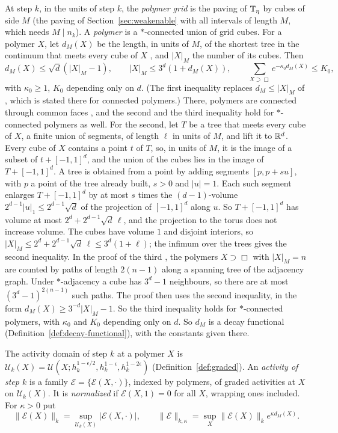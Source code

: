 At step $k$, in the units of step $k$, the \emph{polymer grid} is the paving of $\mathbb T_\eta$ by cubes of side $M$ (the paving of Section~\ref{sec:weakenable} with all intervals of length $M$, which needs $M\mid n_k$). A \emph{polymer} is a $*$-connected union of grid cubes. For a polymer $X$, let $d_M(X)$ be the length, in units of $M$, of the shortest tree in the continuum that meets every cube of $X$ \cite[(119)]{DimockI}, and $|X|_M$ the number of its cubes. Then \cite[(122), (123)]{DimockI}
\begin{equation}\label{eq:dM-facts}
d_M(X)\le\sqrt d(|X|_M-1),\qquad|X|_M\le3^d(1+d_M(X)),\qquad\sum_{X\supset\Box}e^{-\kappa_0d_M(X)}\le K_0 ,
\end{equation}
with $\kappa_0\ge1$, $K_0$ depending only on $d$. (The first inequality replaces $d_M\le|X|_M$ of \cite{DimockI}, which is stated there for connected polymers.) There, polymers are connected through common faces \cite[Sect.~3.1]{DimockI}, and the second and the third inequality hold for $*$-connected polymers as well. For the second, let $T$ be a tree that meets every cube of $X$, a finite union of segments, of length $\ell$ in units of $M$, and lift it to $\mathbb R^d$. Every cube of $X$ contains a point $t$ of $T$, so, in units of $M$, it is the image of a subset of $t+[-1,1]^d$, and the union of the cubes lies in the image of $T+[-1,1]^d$. A tree is obtained from a point by adding segments $[p,p+su]$, with $p$ a point of the tree already built, $s>0$ and $|u|=1$. Each such segment enlarges $T+[-1,1]^d$ by at most $s$ times the $(d-1)$-volume $2^{d-1}|u|_1\le2^{d-1}\sqrt d$ of the projection of $[-1,1]^d$ along $u$. So $T+[-1,1]^d$ has volume at most $2^d+2^{d-1}\sqrt d\,\ell$, and the projection to the torus does not increase volume. The cubes have volume $1$ and disjoint interiors, so $|X|_M\le2^d+2^{d-1}\sqrt d\,\ell\le3^d(1+\ell)$; the infimum over the trees gives the second inequality. In the proof of the third \cite[Lemma~25]{DimockI}, the polymers $X\supset\Box$ with $|X|_M=n$ are counted by paths of length $2(n-1)$ along a spanning tree of the adjacency graph. Under $*$-adjacency a cube has $3^d-1$ neighbours, so there are at most $(3^d-1)^{2(n-1)}$ such paths. The proof then uses the second inequality, in the form $d_M(X)\ge3^{-d}|X|_M-1$. So the third inequality holds for $*$-connected polymers, with $\kappa_0$ and $K_0$ depending only on $d$. So $d_M$ is a decay functional (Definition~\ref{def:decay-functional}), with the constants given there.

\begin{definition}\label{def:activities}
The activity domain of step $k$ at a polymer $X$ is $\mathcal U_k(X)=\mathcal U(X;h_k^{1-\epsilon/2},h_k^{1-\epsilon},h_k^{1-2\epsilon})$ (Definition~\ref{def:graded}). An \emph{activity of step $k$} is a family $\mathcal E=\{\mathcal E(X,\cdot)\}$, indexed by polymers, of graded activities at $X$ on $\mathcal U_k(X)$. It is \emph{normalized} if $\mathcal E(X,1)=0$ for all $X$, wrapping ones included. For $\kappa>0$ put
\[
\|\mathcal E(X)\|_k=\sup_{\mathcal U_k(X)}|\mathcal E(X,\cdot)|,\qquad\|\mathcal E\|_{k,\kappa}=\sup_X\|\mathcal E(X)\|_ke^{\kappa d_M(X)} .
\]
\end{definition}

